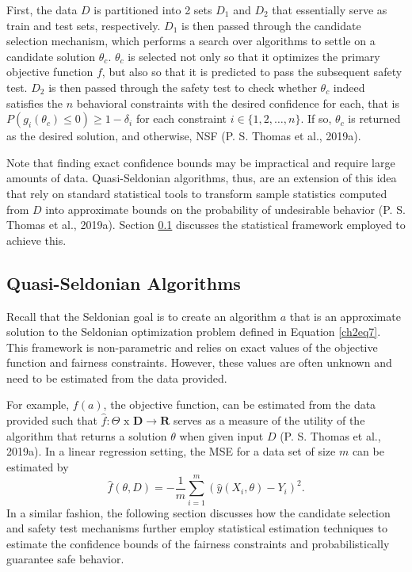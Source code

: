 \documentclass[12pt, twoside]{amherstthesis}
\begin{document}
First, the data \(D\) is partitioned into 2 sets \(D_1\) and \(D_2\) that essentially serve as train and test sets, respectively. \(D_1\) is then passed through the candidate selection mechanism, which performs a search over algorithms to settle on a candidate solution \(\theta_c\). \(\theta_c\) is selected not only so that it optimizes the primary objective function \(f\), but also so that it is predicted to pass the subsequent safety test. \(D_2\) is then passed through the safety test to check whether \(\theta_c\) indeed satisfies the \(n\) behavioral constraints with the desired confidence for each, that is \(P(g_i(\theta_c) \leq 0) \geq 1 - \delta_i\) for each constraint \(i \in \{ 1,2, \ldots, n \}\). If so, \(\theta_c\) is returned as the desired solution, and otherwise, NSF (P. S. Thomas et al., 2019a).

Note that finding exact confidence bounds may be impractical and require large amounts of data. Quasi-Seldonian algorithms, thus, are an extension of this idea that rely on standard statistical tools to transform sample statistics computed from \(D\) into approximate bounds on the probability of undesirable behavior (P. S. Thomas et al., 2019a). Section \ref{qsa} discusses the statistical framework employed to achieve this.

\hypertarget{qsa}{%
\subsection{Quasi-Seldonian Algorithms}\label{qsa}}

Recall that the Seldonian goal is to create an algorithm \(a\) that is an approximate solution to the Seldonian optimization problem defined in Equation \ref{ch2eq7}. This framework is non-parametric and relies on exact values of the objective function and fairness constraints. However, these values are often unknown and need to be estimated from the data provided.

For example, \(f(a)\), the objective function, can be estimated from the data provided such that \(\hat{f}: \Theta \text{ x } \textbf{D} \rightarrow \textbf{R}\) serves as a measure of the utility of the algorithm that returns a solution \(\theta\) when given input \(D\) (P. S. Thomas et al., 2019a). In a linear regression setting, the MSE for a data set of size \(m\) can be estimated by
\begin{equation}
\label{ch2eq9}
\hat{f}(\theta, D) = -\frac{1}{m} \sum_{i=1}^{m}(\hat{y}(X_i, \theta) - Y_i)^2.
\end{equation}
In a similar fashion, the following section discusses how the candidate selection and safety test mechanisms further employ statistical estimation techniques to estimate the confidence bounds of the fairness constraints and probabilistically guarantee safe behavior.
\end{document}
